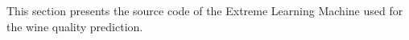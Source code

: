 This section presents the source code of the Extreme Learning Machine used for the wine quality prediction.


